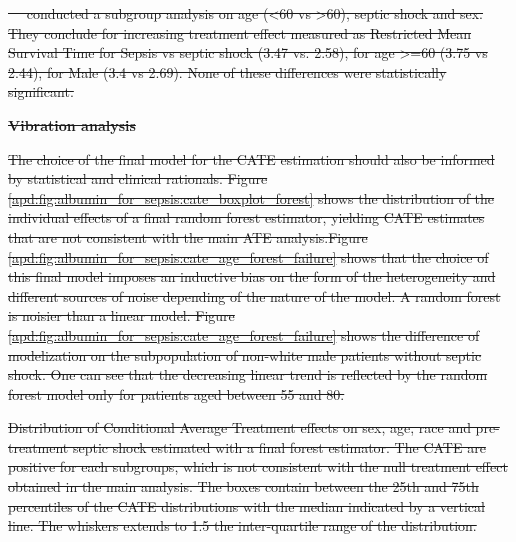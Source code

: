 \documentclass[10pt,letterpaper]{article}
\providecommand{\DIFdeltex}[1]{{\protect\color{red}\sout{#1}}}                      %
\providecommand{\DIFdelFL}[1]{\DIFdel{#1}} %
\providecommand{\DIFdel}[1]{\texorpdfstring{\DIFdeltex{#1}}{}} %
\begin{document}
\DIFdel{\mbox{%
    \cite{zhou2021early} }\hskip0pt%
  conducted a subgroup analysis on age (<60 vs >60), septic
  shock and sex. They conclude for increasing treatment effect measured as
  Restricted Mean Survival Time for Sepsis vs septic shock (3.47 vs. 2.58), for
  age >=60 (3.75 vs 2.44), for Male (3.4 vs 2.69). None of these differences were
  statistically significant.
}%

\textbf{\DIFdel{Vibration analysis}}%

\DIFdel{The choice of the final model for the CATE estimation should also be informed
  by statistical and clinical rationals. Figure
  \ref{apd:fig:albumin_for_sepsis:cate_boxplot_forest} shows the distribution of
  the individual effects of a final random forest estimator, yielding CATE
  estimates that are not consistent with the main ATE analysis.Figure
  \ref{apd:fig:albumin_for_sepsis:cate_age_forest_failure} shows that the choice
  of this final model imposes an inductive bias on the form of the heterogeneity
  and different sources of noise depending of the nature of the model. A random
  forest is noisier than a linear model. Figure
  \ref{apd:fig:albumin_for_sepsis:cate_age_forest_failure} shows the difference
  of modelization on the subpopulation of non-white male patients without septic
  shock. One can see that the decreasing linear trend is reflected by the
  random forest model only for patients aged between 55 and 80.
}%

{%
  \DIFdelFL{Distribution of Conditional Average Treatment effects on sex, age,
    race and pre-treatment septic shock estimated with a final forest
    estimator. The CATE are positive for each subgroups, which is not
    consistent with the null treatment effect obtained in the main analysis.
    The boxes contain between the 25th and 75th percentiles of the CATE
    distributions with the median indicated by a vertical line. The whiskers
    extends to 1.5 the inter-quartile range of the
    distribution.}}%
\end{document}
